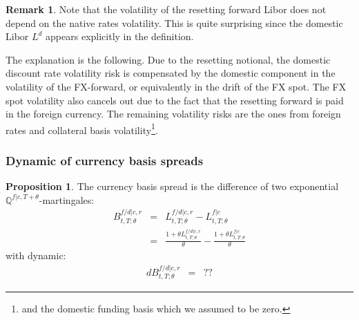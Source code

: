 \documentclass[11pt,english]{amsart}
\newcommand{\QQ}{\mathbb{Q}}
\theoremstyle{definition}
\newtheorem{prop}{Proposition}
\newtheorem{rema}{Remark}
\begin{document}


\begin{rema}
Note that the volatility of the resetting forward Libor does not depend on the native rates volatility. This is quite surprising since the domestic Libor $L^d$ appears explicitly in the definition. 

The explanation is the following. Due to the resetting notional, the domestic discount rate volatility risk is compensated by the domestic component in the volatility of the FX-forward, or equivalently in the drift of the FX spot. The FX spot volatility also cancels out due to the fact that the resetting forward is paid in the foreign currency. The remaining volatility risks are the ones from foreign rates and collateral basis volatility\footnote{and the domestic funding basis which we assumed to be zero.}. 
\end{rema}

\subsubsection{Dynamic of currency basis spreads}


\begin{prop}
The currency basis spread is the difference of two exponential $\QQ^{f|c,T+\theta}$-martingales:
\begin{eqnarray}
  B^{f/d|c,r}_{t,T;\theta} &=& L^{f/d|c,r}_{t,T;\theta} -  L^{f|c}_{t,T;\theta} \\
  &=& \frac{1+\theta L^{f/d|c,r}_{t,T;\theta}}{\theta}  - \frac{1+\theta L^{f|c}_{t,T;\theta}}{\theta} \nonumber
\end{eqnarray} 
with dynamic:
\begin{eqnarray*}
  d B^{f/d|c,r}_{t,T;\theta} 
  &=& ??
\end{eqnarray*} 
\end{prop}
\end{document}
